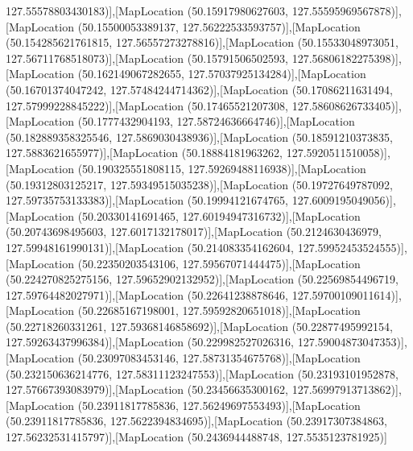 127.55578803430183)],[MapLocation (50.15917980627603, 127.55595969567878)],[MapLocation (50.15500053389137, 127.56222533593757)],[MapLocation (50.154285621761815, 127.56557273278816)],[MapLocation (50.15533048973051, 127.56711768518073)],[MapLocation (50.15791506502593, 127.56806182275398)],[MapLocation (50.162149067282655, 127.57037925134284)],[MapLocation (50.16701374047242, 127.57484244714362)],[MapLocation (50.17086211631494, 127.57999228845222)],[MapLocation (50.17465521207308, 127.58608626733405)],[MapLocation (50.1777432904193, 127.58724636664746)],[MapLocation (50.182889358325546, 127.5869030438936)],[MapLocation (50.18591210373835, 127.5883621655977)],[MapLocation (50.18884181963262, 127.5920511510058)],[MapLocation (50.190325551808115, 127.59269488116938)],[MapLocation (50.19312803125217, 127.59349515035238)],[MapLocation (50.19727649787092, 127.59735753133383)],[MapLocation (50.19994121674765, 127.6009195049056)],[MapLocation (50.20330141691465, 127.60194947316732)],[MapLocation (50.20743698495603, 127.6017132178017)],[MapLocation (50.2124630436979, 127.59948161990131)],[MapLocation (50.214083354162604, 127.59952453524555)],[MapLocation (50.22350203543106, 127.59567071444475)],[MapLocation (50.224270825275156, 127.59652902132952)],[MapLocation (50.22569854496719, 127.59764482027971)],[MapLocation (50.22641238878646, 127.59700109011614)],[MapLocation (50.22685167198001, 127.59592820651018)],[MapLocation (50.22718260331261, 127.59368146858692)],[MapLocation (50.22877495992154, 127.59263437996384)],[MapLocation (50.229982527026316, 127.59004873047353)],[MapLocation (50.23097083453146, 127.58731354675768)],[MapLocation (50.232150636214776, 127.58311123247553)],[MapLocation (50.23193101952878, 127.57667393083979)],[MapLocation (50.23456635300162, 127.56997913713862)],[MapLocation (50.23911817785836, 127.56249697553493)],[MapLocation (50.23911817785836, 127.5622394834695)],[MapLocation (50.23917307384863, 127.56232531415797)],[MapLocation (50.2436944488748, 127.5535123781925)]